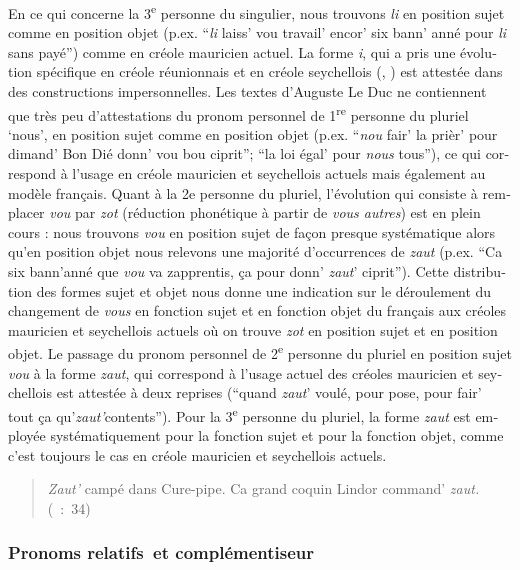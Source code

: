 \documentclass[output=paper]{langscibook}
\begin{document}
\begin{otherlanguage}{french}
En ce qui concerne la 3\textsuperscript{e} personne du singulier, nous trouvons \textit{li} en position sujet comme en position objet (p.ex. “\textit{li} laiss’ vou travail’ encor’ six bann’ anné pour \textit{li} sans payé”) comme en créole mauricien actuel. La forme \textit{i}, qui a pris une évolution spécifique en créole réunionnais et en créole seychellois (\citealt{Michaelis2000}, \citealt{Watbled2016}) est attestée dans des constructions impersonnelles. Les textes d’Auguste Le Duc ne contiennent que très peu d’attestations du pronom personnel de 1\textsuperscript{re} personne du pluriel ‘nous’, en position sujet comme en position objet (p.ex. “\textit{nou} fair’ la prièr’ pour dimand’ Bon Dié donn’ vou bou ciprit”; “la loi égal’ pour \textit{nous} tous”), ce qui correspond à l’usage en créole mauricien et seychellois actuels mais également au modèle français. Quant à la 2e personne du pluriel, l’évolution qui consiste à remplacer \textit{vou} par \textit{zot} (réduction phonétique à partir de \textit{vous autres}) est en plein cours : nous trouvons \textit{vou} en position sujet de façon presque systématique alors qu’en position objet nous relevons une majorité d’occurrences de \textit{zaut} (p.ex. “Ca six bann’anné que \textit{vou} va zapprentis, ça pour donn’ \textit{zaut}’ ciprit”). Cette distribution des formes sujet et objet nous donne une indication sur le déroulement du changement de \textit{vous} en fonction sujet et en fonction objet du français aux créoles mauricien et seychellois actuels où on trouve \textit{zot} en position sujet et en position objet. Le passage du pronom personnel de 2\textsuperscript{e} personne du pluriel en position sujet \textit{vou} à la forme \textit{zaut}, qui correspond à l’usage actuel des créoles mauricien et seychellois est attestée à deux reprises (“quand \textit{zaut}’ voulé, pour pose, pour fair’ tout ça qu’\textit{zaut’}contents”). Pour la 3\textsuperscript{e} personne du pluriel, la forme \textit{zaut} est employée systématiquement pour la fonction sujet et pour la fonction objet, comme c’est toujours le cas en créole mauricien et seychellois actuels. 

\begin{quote}
\textit{Zaut’} campé dans Cure-pipe. Ca grand coquin Lindor command’ \textit{zaut.}\\\hbox{}\hfill\hbox{(\citealt{Pourcelet1994} : 34)}
\end{quote}

\subsubsection{Pronoms relatifs~et complémentiseur}


\end{otherlanguage}
\end{document}

